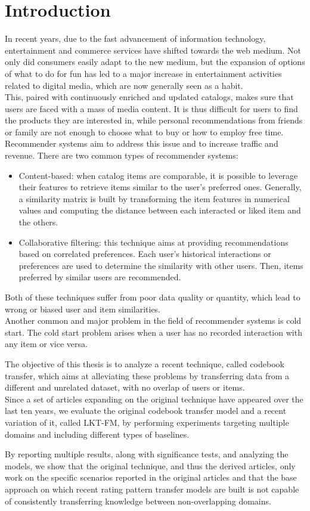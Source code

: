 \chapter{Introduction}

In recent years, due to the fast advancement of information technology, entertainment and commerce services have shifted towards the web medium.
Not only did consumers easily adapt to the new medium, but the expansion of options of what to do for fun has led to a major increase in entertainment activities related to digital media, which are now generally seen as a habit.\\
This, paired with continuously enriched and updated catalogs, makes sure that users are faced with a mass of media content. It is thus difficult for users to find the products they are interested in, while personal recommendations from friends or family are not enough to choose what to buy or how to employ free time. Recommender systems aim to address this issue and to increase traffic and revenue. There are two common types of recommender systems:
\begin{itemize}
\item Content-based: when catalog items are comparable, it is possible to leverage their features to retrieve items similar to the user's preferred ones. Generally, a similarity matrix is built by transforming the item features in numerical values and computing the distance between each interacted or liked item and the others.
\item Collaborative filtering: this technique aims at providing recommendations based on correlated preferences. Each user's historical interactions or preferences are used to determine the similarity with other users. Then, items preferred by similar users are recommended.
\end{itemize}
Both of these techniques suffer from poor data quality or quantity, which lead to wrong or biased user and item similarities.\\
Another common and major problem in the field of recommender systems is cold start.
The cold start problem arises when a user has no recorded interaction with any item or vice versa.\par
The objective of this thesis is to analyze a recent technique, called codebook transfer, which aims at alleviating these problems by transferring data from a different and unrelated dataset, with no overlap of users or items.\\
Since a set of articles expanding on the original technique have appeared over the last ten years, we evaluate the original codebook transfer model and a recent variation of it, called LKT-FM, by performing experiments targeting multiple domains and including different types of baselines.\par
By reporting multiple results, along with significance tests, and analyzing the models, we show that the original technique, and thus the derived articles, only work on the specific scenarios reported in the original articles and that the base approach on which recent rating pattern transfer models are built is not capable of consistently transferring knowledge between non-overlapping domains.



